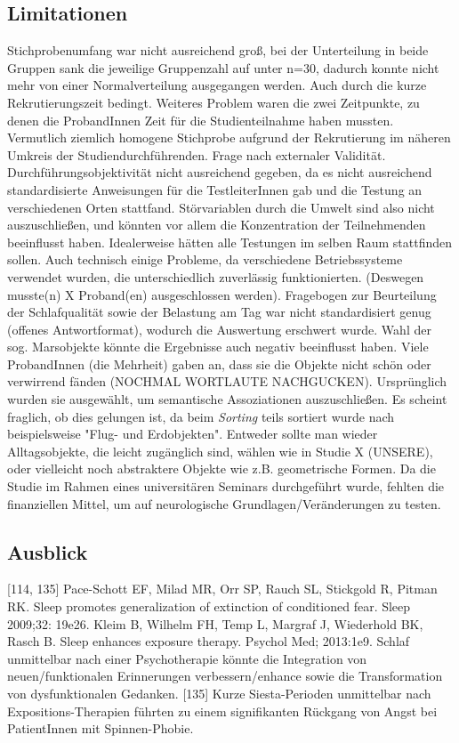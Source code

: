 \subsection{Limitationen}
Stichprobenumfang war nicht ausreichend groß, bei der Unterteilung in beide Gruppen sank die jeweilige Gruppenzahl auf unter n=30, dadurch konnte nicht mehr von einer Normalverteilung ausgegangen werden. Auch durch die kurze Rekrutierungszeit bedingt. Weiteres Problem waren die zwei Zeitpunkte, zu denen die ProbandInnen Zeit für die Studienteilnahme haben mussten.
Vermutlich ziemlich homogene Stichprobe aufgrund der Rekrutierung im näheren Umkreis der Studiendurchführenden.
Frage nach externaler Validität.
Durchführungsobjektivität nicht ausreichend gegeben, da es nicht ausreichend standardisierte Anweisungen für die TestleiterInnen gab und die Testung an verschiedenen Orten stattfand. Störvariablen durch die Umwelt sind also nicht auszuschließen, und könnten vor allem die Konzentration der Teilnehmenden beeinflusst haben. Idealerweise hätten alle Testungen im selben Raum stattfinden sollen.
Auch technisch einige Probleme, da verschiedene Betriebssysteme verwendet wurden, die unterschiedlich zuverlässig funktionierten. (Deswegen musste(n) X Proband(en) ausgeschlossen werden).
Fragebogen zur Beurteilung der Schlafqualität sowie der Belastung am Tag war nicht standardisiert genug (offenes Antwortformat), wodurch die Auswertung erschwert wurde.
Wahl der sog. Marsobjekte könnte die Ergebnisse auch negativ beeinflusst haben. Viele ProbandInnen (die Mehrheit) gaben an, dass sie die Objekte nicht schön oder verwirrend fänden (NOCHMAL WORTLAUTE NACHGUCKEN). Ursprünglich wurden sie ausgewählt, um semantische Assoziationen auszuschließen. Es scheint fraglich, ob dies gelungen ist, da beim \textit{Sorting} teils sortiert wurde nach beispielsweise "Flug- und Erdobjekten". Entweder sollte man wieder Alltagsobjekte, die leicht zugänglich sind, wählen wie in Studie X (UNSERE), oder vielleicht noch abstraktere Objekte wie z.B. geometrische Formen.
Da die Studie im Rahmen eines universitären Seminars durchgeführt wurde, fehlten die finanziellen Mittel, um auf neurologische Grundlagen/Veränderungen zu testen.

\subsection{Ausblick}
[114, 135]
Pace-Schott EF, Milad MR, Orr SP, Rauch SL, Stickgold R, Pitman RK. Sleep promotes generalization of extinction of conditioned fear. Sleep 2009;32: 19e26.
Kleim B, Wilhelm FH, Temp L, Margraf J, Wiederhold BK, Rasch B. Sleep enhances exposure therapy. Psychol Med; 2013:1e9.
Schlaf unmittelbar nach einer Psychotherapie könnte die Integration von neuen/funktionalen Erinnerungen verbessern/enhance sowie die Transformation von dysfunktionalen Gedanken.
[135] Kurze Siesta-Perioden unmittelbar nach Expositions-Therapien führten zu einem signifikanten Rückgang von Angst bei PatientInnen mit Spinnen-Phobie.


\cite{Test}

\newpage



\clearpage






